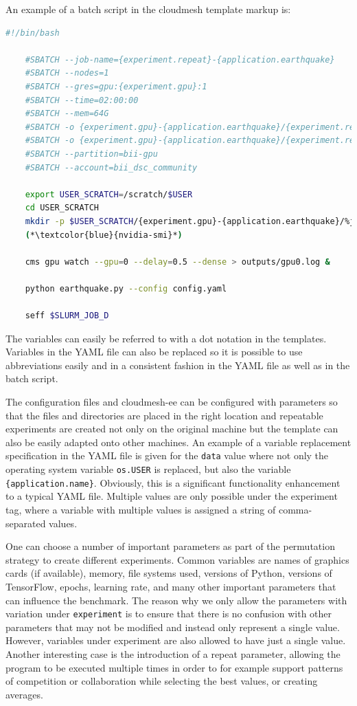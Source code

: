 \documentclass[utf8]{FrontiersinVancouver} %
\begin{document}
An example of a batch script in the cloudmesh template markup  is:

\begin{lstlisting}[language=sh]
    #!/bin/bash

    #SBATCH --job-name={experiment.repeat}-{application.earthquake}
    #SBATCH --nodes=1
    #SBATCH --gres=gpu:{experiment.gpu}:1
    #SBATCH --time=02:00:00
    #SBATCH --mem=64G
    #SBATCH -o {experiment.gpu}-{application.earthquake}/{experiment.repeat}-%j.out
    #SBATCH -o {experiment.gpu}-{application.earthquake}/{experiment.repeat}-%j.err
    #SBATCH --partition=bii-gpu
    #SBATCH --account=bii_dsc_community

    export USER_SCRATCH=/scratch/$USER
    cd USER_SCRATCH
    mkdir -p $USER_SCRATCH/{experiment.gpu}-{application.earthquake}/%j.out
    (*\textcolor{blue}{nvidia-smi}*)

    cms gpu watch --gpu=0 --delay=0.5 --dense > outputs/gpu0.log &

    python earthquake.py --config config.yaml

    seff $SLURM_JOB_D
\end{lstlisting}

The variables can easily be referred to with a dot notation in the templates.  Variables in the YAML file can also be replaced so it is possible to use abbreviations easily and in a consistent fashion in the YAML file as well as in the batch script.

The configuration files and cloudmesh-ee can be configured with parameters so that the files and directories are placed in the right location and repeatable experiments are created not only on the original machine but the template can also be easily adapted onto other machines. An example of a variable replacement specification in the YAML file is given for the \verb|data| value where not only the operating system variable \verb|os.USER| is replaced, but also the variable \verb|{application.name}|. Obviously, this is a significant functionality enhancement to a typical YAML file.  Multiple values are only possible under the experiment tag, where a variable with multiple values is assigned a string of comma-separated values.

One can choose a number of important parameters as part of the permutation strategy to create different experiments. Common variables are names of graphics cards (if available), memory, file systems used, versions of Python, versions of TensorFlow, epochs, learning rate, and many other important parameters that can influence the benchmark.  The reason why we only allow the parameters with variation under \verb|experiment| is to ensure that there is no confusion with other parameters that may not be modified and instead only represent a single value. However, variables under experiment are also allowed to have just a single value.  Another interesting case is the introduction of a repeat parameter, allowing the program to be executed multiple times in order to for example support patterns of competition or collaboration while selecting the best values, or creating averages.
\end{document}
